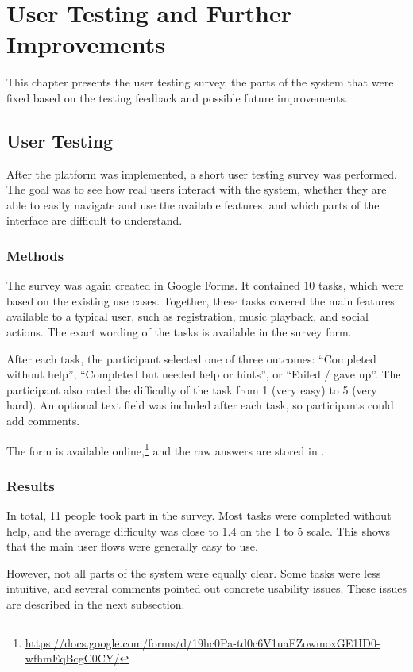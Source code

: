 \chapter{User Testing and Further Improvements}\label{ch:user_testing_improvements}
This chapter presents the user testing survey, the parts of the system that were fixed
based on the testing feedback and possible future improvements.


\section{User Testing}
After the platform was implemented, a short user testing survey was
performed. The goal was to see how real users interact with the
system, whether they are able to easily navigate and use the available features,
and which parts of the interface are difficult to understand.

\subsection{Methods}
The survey was again created in Google Forms. It contained 10 tasks,
which were based on the existing use cases. Together, these tasks
covered the main features available to a typical user, such as
registration, music playback, and social actions. The exact wording
of the tasks is available in the survey form.

After each task, the participant selected one of three outcomes:
``Completed without help'', ``Completed but needed help or hints'', or
``Failed / gave up''. The participant also rated the difficulty of the
task from 1 (very easy) to 5 (very hard). An optional text field was
included after each task, so participants could add comments.

The form is available
online,\footnote{\url{https://docs.google.com/forms/d/19hc0Pa-td0c6V1uaFZowmoxGE1ID0-wfhmEqBcgC0CY/}}
and the raw answers are stored in .

\subsection{Results}
In total, 11 people took part in the survey. Most tasks were completed
without help, and the average difficulty was close to 1.4 on the
1 to 5 scale. This shows that the main user flows were generally easy
to use.

However, not all parts of the system were equally clear. Some tasks
were less intuitive, and several comments pointed out concrete usability
issues. These issues are described in the next subsection.

